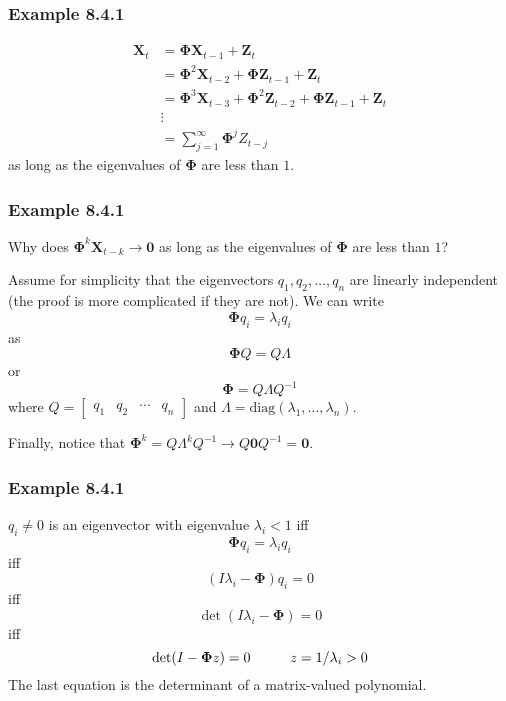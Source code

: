 \documentclass{beamer}
\begin{document}
\begin{frame}
\frametitle{Example 8.4.1}


\begin{align*}
\mathbf{X}_t &= \bm{\Phi} \mathbf{X}_{t-1} + \mathbf{Z}_t \\
&= \bm{\Phi}^2 \mathbf{X}_{t-2} + \bm{\Phi} \mathbf{Z}_{t-1} + \mathbf{Z}_t \\
&= \bm{\Phi}^3 \mathbf{X}_{t-3} + \bm{\Phi}^2 \mathbf{Z}_{t-2} + \bm{\Phi} \mathbf{Z}_{t-1} + \mathbf{Z}_t\\
&\vdots \\
&= \sum_{j=1}^{\infty} \bm{\Phi}^j Z_{t-j}
\end{align*}
as long as the eigenvalues of $\bm{\Phi}$ are less than $1$.


\end{frame}



\begin{frame}
\frametitle{Example 8.4.1}


Why does $\bm{\Phi}^k \mathbf{X}_{t-k} \to \mathbf{0}$ as long as the eigenvalues of $\bm{\Phi}$ are less than $1$?
\newline

Assume for simplicity that the eigenvectors $q_1, q_2, \ldots, q_n$ are linearly independent (the proof is more complicated if they are not). We can write 
\[
\bm{\Phi} q_i = \lambda_i q_i
\]
as
\[
\bm{\Phi}Q   = Q \Lambda 
\]
or
\[
\bm{\Phi} = Q \Lambda Q^{-1}
\]
where $Q = [\begin{array}{cccc}q_1 & q_2 & \cdots & q_n \end{array}]$ and $\Lambda = \text{diag}(\lambda_1, \ldots, \lambda_n)$. 
\newline

Finally, notice that $\bm{\Phi}^k = Q \Lambda^k Q^{-1} \to Q \mathbf{0} Q^{-1} = \mathbf{0}$.


\end{frame}


\begin{frame}
\frametitle{Example 8.4.1}

$q_i \neq 0$ is an eigenvector with eigenvalue $\lambda_i < 1$ iff
\[
\bm{\Phi} q_i = \lambda_i q_i
\]
iff
\[
(I\lambda_i - \bm{\Phi}) q_i = 0
\]
iff
\[
\det(I\lambda_i - \bm{\Phi}) = 0
\]
iff
\[
\det(I - \bm{\Phi}z) = 0  \hspace{10mm} z = 1/\lambda_i> 0
\]
\pause
The last equation is the determinant of a matrix-valued polynomial.

\end{frame}
\end{document}
